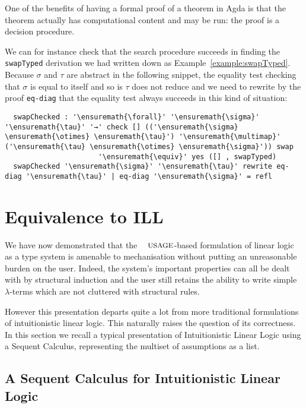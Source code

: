 One of the benefits of having a formal proof of a theorem in Agda is that
the theorem actually has computational content and may be run: the proof
is a decision procedure.

\begin{example}We can for instance check that the search procedure
succeeds in finding the \texttt{swapTyped} derivation we had written down
as Example~\ref{example:swapTyped}. Because \ensuremath{\sigma} and \ensuremath{\tau} are abstract in the
following snippet, the equality test checking that \ensuremath{\sigma} is equal to itself
and so is \ensuremath{\tau} does not reduce and we need to rewrite by the proof
\texttt{eq-diag} that the equality test always succeeds in this kind of
situation:
\begin{lstlisting}
  swapChecked : '\ensuremath{\forall}' '\ensuremath{\sigma}' '\ensuremath{\tau}' '→' check [] (('\ensuremath{\sigma} \ensuremath{\otimes} \ensuremath{\tau}') '\ensuremath{\multimap}' ('\ensuremath{\tau} \ensuremath{\otimes} \ensuremath{\sigma}')) swap
                      '\ensuremath{\equiv}' yes ([] , swapTyped)
  swapChecked '\ensuremath{\sigma}' '\ensuremath{\tau}' rewrite eq-diag '\ensuremath{\tau}' | eq-diag '\ensuremath{\sigma}' = refl
\end{lstlisting}
\end{example}



\section{Equivalence to ILL}\label{sec:equivalence}

We have now demonstrated that the $\Usages{}$-based formulation of
linear logic as a type system is amenable to mechanisation without
putting an unreasonable burden on the user. Indeed, the system's
important properties can all be dealt with by structural induction
and the user still retains the ability to write simple $\ensuremath{\lambda}$-terms
which are not cluttered with structural rules.

However this presentation departs quite a lot from more traditional
formulations of intuitionistic linear logic. This naturally raises
the question of its correctness. In this section we recall a typical
presentation of Intuitionistic Linear Logic using a Sequent Calculus,
representing the multiset of assumptions as a list.

\subsection{A Sequent Calculus for Intuitionistic Linear Logic}

